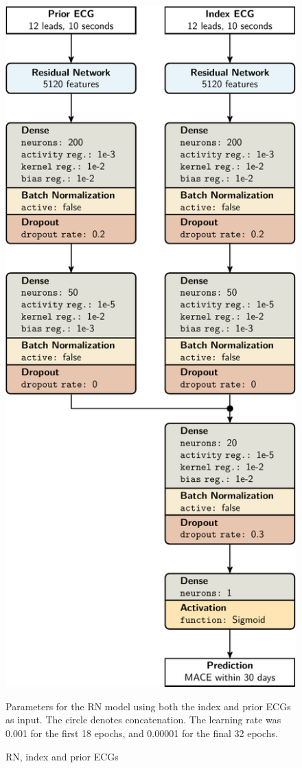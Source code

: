 \documentclass[preprint]{elsarticle}
\begin{document}
\begin{figure}[H]
\centering
\includegraphics[scale=\modelscale,keepaspectratio,trim=0 0 -16em 0]{figures/model-rn2.pdf}
\caption{RN, index and prior ECGs}
\medskip
\small
Parameters for the RN model using both the index and prior ECGs as input. The circle denotes concatenation. The learning rate was 0.001 for the first 18 epochs, and 0.00001 for the final 32 epochs. 
\end{figure}
\end{document}
